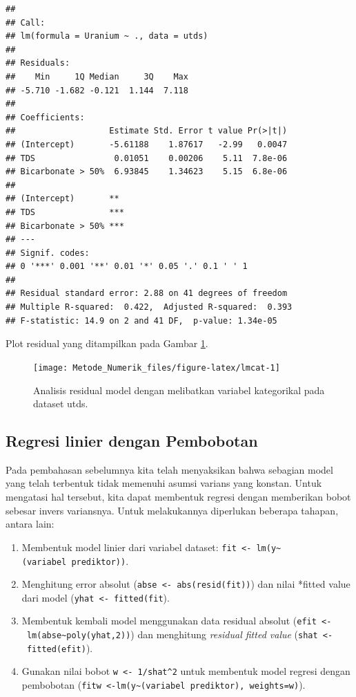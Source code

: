 \documentclass[]{book}
\providecommand{\tightlist}{%
  \setlength{\itemsep}{0pt}\setlength{\parskip}{0pt}}
\theoremstyle{definition}
\theoremstyle{definition}
\theoremstyle{definition}
\theoremstyle{remark}
\begin{document}
\begin{verbatim}
## 
## Call:
## lm(formula = Uranium ~ ., data = utds)
## 
## Residuals:
##    Min     1Q Median     3Q    Max 
## -5.710 -1.682 -0.121  1.144  7.118 
## 
## Coefficients:
##                   Estimate Std. Error t value Pr(>|t|)
## (Intercept)       -5.61188    1.87617   -2.99   0.0047
## TDS                0.01051    0.00206    5.11  7.8e-06
## Bicarbonate > 50%  6.93845    1.34623    5.15  6.8e-06
##                      
## (Intercept)       ** 
## TDS               ***
## Bicarbonate > 50% ***
## ---
## Signif. codes:  
## 0 '***' 0.001 '**' 0.01 '*' 0.05 '.' 0.1 ' ' 1
## 
## Residual standard error: 2.88 on 41 degrees of freedom
## Multiple R-squared:  0.422,  Adjusted R-squared:  0.393 
## F-statistic: 14.9 on 2 and 41 DF,  p-value: 1.34e-05
\end{verbatim}

Plot residual yang ditampilkan pada Gambar \ref{fig:lmcat}.

\begin{figure}

{\centering \texttt{[image: Metode\_Numerik\_files/figure-latex/lmcat-1]} 

}

\caption{Analisis residual model dengan melibatkan variabel kategorikal pada dataset utds.}\label{fig:lmcat}
\end{figure}

\hypertarget{wlr}{%
\subsection{Regresi linier dengan Pembobotan}\label{wlr}}

Pada pembahasan sebelumnya kita telah menyaksikan bahwa sebagian model yang telah terbentuk tidak memenuhi asumsi varians yang konstan. Untuk mengatasi hal tersebut, kita dapat membentuk regresi dengan memberikan bobot sebesar invers variansnya. Untuk melakukannya diperlukan beberapa tahapan, antara lain:

\begin{enumerate}
\def\labelenumi{\arabic{enumi}.}
\tightlist
\item
  Membentuk model linier dari variabel dataset: \texttt{fit\ \textless{}-\ lm(y\textasciitilde{}(variabel\ prediktor))}.
\item
  Menghitung error absolut (\texttt{abse\ \textless{}-\ abs(resid(fit))}) dan nilai *fitted value dari model (\texttt{yhat\ \textless{}-\ fitted(fit}).
\item
  Membentuk kembali model menggunakan data residual absolut (\texttt{efit\ \textless{}-\ lm(abse\textasciitilde{}poly(yhat,2))}) dan menghitung \emph{residual fitted value} (\texttt{shat\ \textless{}-\ fitted(efit)}).
\item
  Gunakan nilai bobot \texttt{w\ \textless{}-\ 1/shat\^{}2} untuk membentuk model regresi dengan pembobotan (\texttt{fitw\ \textless{}-lm(y\textasciitilde{}(variabel\ prediktor),\ weights=w)}).
\end{enumerate}
\end{document}
